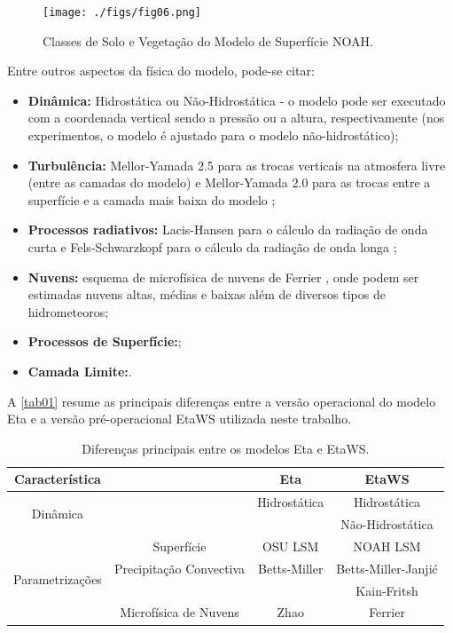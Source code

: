 \begin{figure}[!hbp]
\centering
\texttt{[image: ./figs/fig06.png]}
\caption{Classes de Solo e Vegetação do Modelo de Superfície NOAH.}
\label{fig06}
\end{figure}

Entre outros aspectos da física do modelo, pode-se citar:

\begin{itemize}
\item \textbf{Dinâmica:} Hidrostática ou Não-Hidrostática - o modelo pode ser executado com a coordenada vertical sendo a pressão ou a altura, respectivamente (nos experimentos, o modelo é ajustado para o modelo não-hidrostático);
\item \textbf{Turbulência:} Mellor-Yamada 2.5 para as trocas verticais na atmosfera livre (entre as camadas do modelo) e Mellor-Yamada 2.0 para as trocas entre a superfície e a camada mais baixa do modelo \cite{melloryamada74};
\item \textbf{Processos radiativos:} Lacis-Hansen para o cálculo da radiação de onda curta \cite{lacishansen74} e Fels-Schwarzkopf para o cálculo da radiação de onda longa \cite{felsschwarzkopf75};
\item \textbf{Nuvens:} esquema de microfísica de nuvens de Ferrier \cite{ferrieretal02}, onde podem ser estimadas nuvens altas, médias e baixas além de diversos tipos de hidrometeoros;
\item \textbf{Processos de Superfície:};
\item \textbf{Camada Limite:}.
\end{itemize}

A \autoref{tab01} resume as principais diferenças entre a versão operacional do modelo Eta e a versão pré-operacional EtaWS utilizada neste trabalho.

\begin{table}[!hbp]
\caption{Diferenças principais entre os modelos Eta e EtaWS.}
\label{tab01}
\centering
\begin{tabular}{c|c|c|c}
\hline
Característica                       &                         & Eta               & EtaWS              \\
\hline
\multirow{2}{2.8cm}{Dinâmica}        &                         & Hidrostática      & Hidrostática       \\
                                     &                         &                   & Não-Hidrostática   \\
\hline
                                     & Superfície              & OSU LSM           & NOAH LSM           \\ 
\multirow{2}{2.8cm}{Parametrizações} & Precipitação Convectiva & Betts-Miller      & Betts-Miller-Janjić\\
                                     &                         &                   & Kain-Fritsh        \\
                                     & Microfísica de Nuvens   & Zhao              & Ferrier            \\
\hline
\end{tabular}
\end{table}

